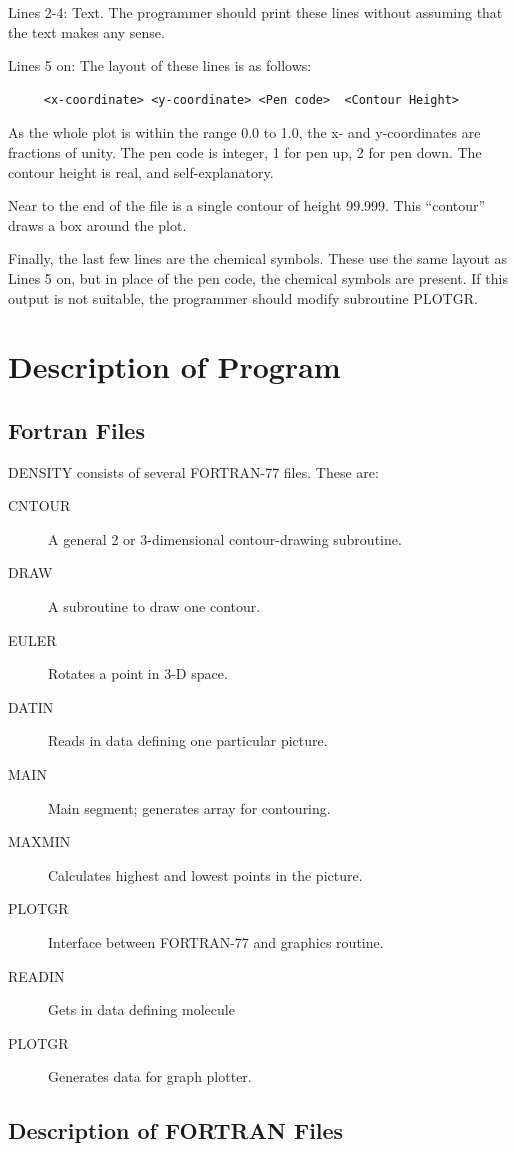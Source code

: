  Lines 2-4: Text. The programmer should print these lines without assuming
that the text makes any sense.

 Lines 5 on: The layout of these lines is as follows:
\begin{verbatim}
     <x-coordinate> <y-coordinate> <Pen code>  <Contour Height>
\end{verbatim}
As the whole plot is within the range 0.0 to 1.0, the x- and y-coordinates
are fractions of unity. The pen code is integer, 1 for pen up, 2 for pen down.
The contour height is real, and self-explanatory.

 Near to the end of the file is a single contour of height 99.999. This
 ``contour''
draws a box around the plot.

 Finally, the last few lines are the chemical symbols. These use the
same layout as Lines 5 on, but in place of the pen code, the chemical symbols
are present.
If this output is not
suitable, the programmer should modify subroutine PLOTGR.

\section{Description of Program}
\subsection{Fortran Files}
 DENSITY consists of several FORTRAN-77 files. These are:
\begin{description}
\item[CNTOUR] A general 2 or 3-dimensional contour-drawing subroutine.
\item[DRAW] A subroutine to draw one contour.
\item[EULER] Rotates a point in 3-D space.
\item[DATIN] Reads in data defining one particular picture.
\item[MAIN] Main segment; generates array for contouring.
\item[MAXMIN] Calculates highest and lowest points in the picture.
\item[PLOTGR] Interface between FORTRAN-77 and graphics routine.
\item[READIN] Gets in data defining molecule
\item[PLOTGR] Generates data for graph plotter.
\end{description}

\subsection{Description of FORTRAN Files}
